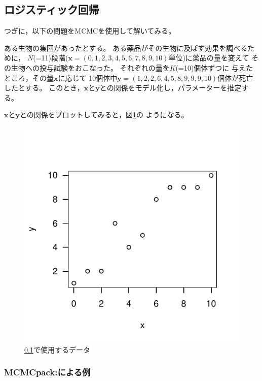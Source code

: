 \documentclass[11pt,uplatex]{jsarticle}
\begin{document}
\vspace{1zw}




\subsection{ロジスティック回帰}
\label{logistic}


つぎに，以下の問題をMCMCを使用して解いてみる。
\vspace{1zw}

\hspace{18mm}
\begin{minipage}{100mm}
\begin{breakbox}
\noindent
ある生物の集団があったとする。
ある薬品がその生物に及ぼす効果を調べるために，
$N$(=11)段階($\bm{x} = (0, 1, 2, 3, 4, 5, 6, 7, 8, 9, 10)$単位)に薬品の量を変えて
その生物への投与試験をおこなった。
それぞれの量を$K$(=10)個体ずつに
与えたところ，その量$\bm{x}$に応じて
10個体中$\bm{y} = (1, 2, 2, 6, 4, 5, 8, 9, 9, 9, 10)$個体が死亡したとする。
このとき，$\bm{x}$と$\bm{y}$との関係をモデル化し，パラメーターを推定する。
\end{breakbox}
\end{minipage}
\vspace{1zw}

$\bm{x}$と$\bm{y}$との関係をプロットしてみると，図\ref{example2_plot}の
ようになる。

\begin{figure}[htbp]
  \begin{center}
    \includegraphics[bb=0 0 240 240, clip, width=160 bp]{example2.pdf}
  \end{center}
  \caption{\ref{logistic}で使用するデータ}
  \label{example2_plot}
\end{figure}


\subsubsection{MCMCpack:による例}
\end{document}
